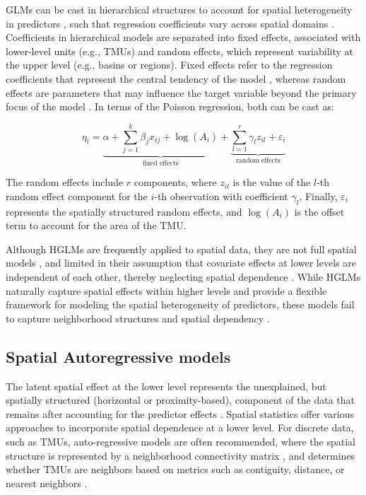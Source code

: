 \documentclass[journal abbreviation, manuscript]{copernicus}
\begin{document}
GLMs can be cast in hierarchical structures to account for spatial heterogeneity in predictors \citep{lee1996hierarchical, lee2017data}, such that regression coefficients vary across spatial domains \citep{atkinson1998generalized, ma2021bayesian, dalthorp2004generalized}. Coefficients in hierarchical models are separated into fixed effects, associated with lower-level units (e.g., TMUs) and random effects, which represent variability at the upper level (e.g., basins or regions). Fixed effects refer to the regression coefficients that represent the central tendency of the model \citep{torres2007panel}, whereas random effects are parameters that may influence the target variable beyond the primary focus of the model \citep{firebaugh2013fixed}. In terms of the Poisson regression, both can be cast as:

\begin{equation}
\eta_i = \underbrace{\alpha + \sum_{j=1}^k \beta_j x_{ij} + \log(A_i)}_{\text{fixed effects}} + \underbrace{\sum_{l=1}^r \gamma_l z_{il} + \varepsilon_i}_{\text{random effects}}
\end{equation}

The random effects include $r$ components, where $z_{il}$ is the value of the $l$-th random effect component for the $i$-th observation with coefficient $\gamma_{l}$. Finally, $\varepsilon_i$ represents the spatially structured random effects, and $\log(A_i)$ is the offset term to account for the area of the TMU.

Although HGLMs are frequently applied to spatial data, they are not full spatial models \citep{dong2015multilevel}, and limited in their assumption that covariate effects at lower levels are independent of each other, thereby neglecting spatial dependence \citep{raudenbush2002hierarchical, goldstein2011multilevel}. While HGLMs naturally capture spatial effects within higher levels and provide a flexible framework for modeling the spatial heterogeneity of predictors, these models fail to capture neighborhood structures and spatial dependency \citep{dong2015multilevel, osland2016accounting, rabe2008multilevel}.

\subsection{Spatial Autoregressive models}\label{subsec22}

The latent spatial effect at the lower level represents the unexplained, but spatially structured (horizontal or proximity-based), component of the data that remains after accounting for the predictor effects \citep{austin2013covariate, aigner1984latent}. Spatial statistics offer various approaches to incorporate spatial dependence at a lower level. For discrete data, such as TMUs, auto-regressive models are often recommended, where the spatial structure is represented by a neighborhood connectivity matrix \citep{rodrigues2012bayesian}, and determines whether TMUs are neighbors based on metrics such as contiguity, distance, or nearest neighbors \citep{moraga2023spatial}.
\end{document}
